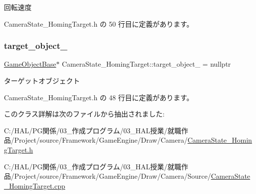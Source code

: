 回転速度 



 Camera\+State\+\_\+\+Homing\+Target.\+h の 50 行目に定義があります。

\mbox{\label{class_camera_state___homing_target_af9c54d8f2241883f8ed9598288a0185a}} 
\subsubsection{\texorpdfstring{target\+\_\+object\+\_\+}{target\_object\_}}
{\footnotesize\ttfamily \mbox{\hyperlink{class_game_object_base}{Game\+Object\+Base}}$\ast$ Camera\+State\+\_\+\+Homing\+Target\+::target\+\_\+object\+\_\+ = nullptr\hspace{0.3cm}{\ttfamily [private]}}



ターゲットオブジェクト 



 Camera\+State\+\_\+\+Homing\+Target.\+h の 48 行目に定義があります。



このクラス詳解は次のファイルから抽出されました\+:\begin{DoxyCompactItemize}
\item 
C\+:/\+H\+A\+L/\+P\+G関係/03\+\_\+作成プログラム/03\+\_\+\+H\+A\+L授業/就職作品/\+Project/source/\+Framework/\+Game\+Engine/\+Draw/\+Camera/\mbox{\hyperlink{_camera_state___homing_target_8h}{Camera\+State\+\_\+\+Homing\+Target.\+h}}\item 
C\+:/\+H\+A\+L/\+P\+G関係/03\+\_\+作成プログラム/03\+\_\+\+H\+A\+L授業/就職作品/\+Project/source/\+Framework/\+Game\+Engine/\+Draw/\+Camera/\+Source/\mbox{\hyperlink{_camera_state___homing_target_8cpp}{Camera\+State\+\_\+\+Homing\+Target.\+cpp}}\end{DoxyCompactItemize}
